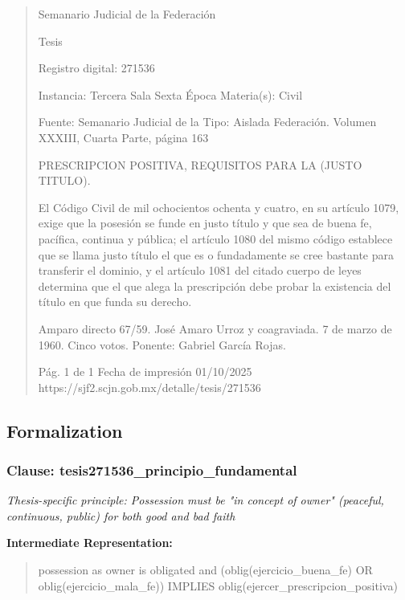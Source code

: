 \documentclass[11pt,a4paper]{article}
\begin{document}
\begin{quote}
                                                   Semanario Judicial de la Federación

                                                  Tesis

 Registro digital: 271536

 Instancia: Tercera Sala          Sexta Época                           Materia(s): Civil

                                  Fuente: Semanario Judicial de la      Tipo: Aislada
                                  Federación.
                                  Volumen XXXIII, Cuarta Parte,
                                  página 163


PRESCRIPCION POSITIVA, REQUISITOS PARA LA (JUSTO TITULO).


El Código Civil de mil ochocientos ochenta y cuatro, en su artículo 1079, exige que la posesión se
funde en justo título y que sea de buena fe, pacífica, continua y pública; el artículo 1080 del mismo
código establece que se llama justo título el que es o fundadamente se cree bastante para transferir
el dominio, y el artículo 1081 del citado cuerpo de leyes determina que el que alega la prescripción
debe probar la existencia del título en que funda su derecho.


Amparo directo 67/59. José Amaro Urroz y coagraviada. 7 de marzo de 1960. Cinco votos. Ponente:
Gabriel García Rojas.




                                             Pág. 1 de 1             Fecha de impresión 01/10/2025
  https://sjf2.scjn.gob.mx/detalle/tesis/271536

\end{quote}

\subsection{Formalization}

\subsubsection{Clause: tesis271536\_principio\_fundamental}

\textit{Thesis-specific principle: Possession must be "in concept of owner" (peaceful, continuous, public) for both good and bad faith}

\textbf{Intermediate Representation:}

\begin{quote}
possession as owner is obligated and (oblig(ejercicio\_buena\_fe) OR oblig(ejercicio\_mala\_fe)) IMPLIES oblig(ejercer\_prescripcion\_positiva)
\end{quote}
\end{document}
